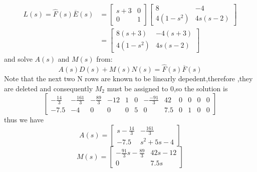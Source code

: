 \documentclass{article}
\begin{document}
\[ 
    \begin{split}
    L(s)=\hat{F}(s)\overline{E}(s)&=
    \left[ 
        \begin{array}{cc}
            s+3  & 0\\
            0 & 1
        \end{array}
    \right]\left[ 
        \begin{array}{cc}
        8 & -4\\
        4(1-s^2) & 4s(s-2)
        \end{array}
    \right]\\
   & =\left[ 
        \begin{array}{cc}
            8(s+3) & -4(s+3)\\
            4(1-s^2) & 4s(s-2)
        \end{array}
    \right]
    \end{split}
\]
and solve $A(s)$ and $M(s)$ from:
\[A(s)D(s)+M(s)N(s)=\hat{F}(s)\overline{F}(s)\]
Note that the next two N rows are known to be linearly depedent,therefore ,they are deleted and consequently $M_2$ must be 
assigned to 0,so the solution is 
\[
\left[
    \begin{array}{cccccccccccc}
        -\frac{14}{3} & -\frac{161}{3} & -\frac{89}{3} & -12 & 1 & 0 & -\frac{-91}{3} & 42 & 0 & 0 & 0 & 0  \\
        -7.5 & -4 & 0 & 0& 0 & 5 & 0 & 7.5 & 0  & 1 & 0 & 0
    \end{array}
\right]    
\]
thus we have
\[
A(s)=\left[ 
    \begin{array}{cc}
        s-\frac{14}{3} & -\frac{161}{3}\\
        -7.5 & s^2+5s-4
    \end{array}
\right]    
\]
\[ 
    M(s)=\left[ 
        \begin{array}{cc}
            -\frac{91}{3}s-\frac{89}{3} & 42s-12\\
            0 & 7.5s
        \end{array}
    \right]   
\]
\end{document}

